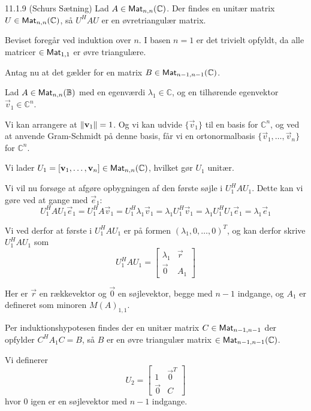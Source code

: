 \begin{saetning}{11.1.9 (Schurs Sætning)}
	Lad $A\in \textsf{Mat}_{n,n}(\mathbb{C})$. Der findes en unitær matrix $U\in \textsf{Mat}_{
	n,n}(\mathbb{C})$, så $U^HAU$ er en øvretriangulær matrix.
\end{saetning}

\begin{bevis}
	\setlength{\parindent}{0cm}
	Beviset foregår ved induktion over $n$. I basen $n=1$ er det trivielt
	opfyldt, da alle matricer $\in \textsf{Mat}_{1,1}$ er øvre triangulære.
	
	\noindent
	Antag nu at det gælder for en matrix $B \in \textsf{Mat}_{n-1,n-1}(\mathbb{C})$.
	
	Lad $A\in \textsf{Mat}_{n,n}(\mathbb{B})$ med en egenværdi $\lambda_1 \in
	\mathbb{C}$, og en tilhørende egenvektor $\vec{v}_1 \in \mathbb{C}^n$.

	Vi kan arrangere at $\lVert\mathbf{v}_1\rVert = 1$. Og vi kan udvide
	$\{\vec{v}_1\}$ til en basis for $\mathbb{C}^n$, og ved at anvende
	Gram-Schmidt på denne basis, får vi en ortonormalbasis $\{\vec{v}_1, \dotsc
	,\vec{v}_n\}$ for $\mathbb{C}^n$.

	Vi lader $U_1 = [\mathbf{v}_1, \dotsc, \mathbf{v}_n] \in \textsf{Mat}_{n,n}(\mathbb{C})$,
	hvilket gør $U_1$ unitær.

	Vi vil nu forsøge at afgøre opbygningen af den første søjle i $U_1^HAU_1$.
	Dette kan vi gøre ved at gange med $\vec{e}_1$:
	\[
		U_1^HAU_1\vec{e}_1
		= U_1^HA\vec{v}_1
		= U_1^H\lambda_1\vec{v}_1
		= \lambda_1U_1^H\vec{v}_1
		= \lambda_1U_1^HU_1\vec{e}_1
		= \lambda_1\vec{e}_1
	\]

	Vi ved derfor at første i $U_1^HAU_1$ er på formen $(\lambda_1, 0,
	\dotsc,0)^T$, og kan derfor skrive $U_1^HAU_1$ som
	\[
		U_1^HAU_1 = \begin{bmatrix}
			\lambda_1 & \vec{r}\\
			\vec{0}   & A_1
		\end{bmatrix}
	\]

	Her er $\vec{r}$ en rækkevektor og $\vec{0}$ en søjlevektor, begge med
	$n-1$ indgange, og $A_1$ er defineret som minoren $M(A)_{1,1}$.
	
	Per induktionshypotesen findes der en unitær matrix $C \in \textsf{Mat}_{n-1,n-1}$
	der opfylder $C^HA_1C=B$, så $B$ er en øvre triangulær matrix $\in
	\textsf{Mat}_{n-1,n-1}(\mathbb{C})$.

	Vi definerer
	\[
		U_2 = \begin{bmatrix}
			1       & \vec{0}^T\\
			\vec{0} & C
		\end{bmatrix}
	\]
	hvor $0$ igen er en søjlevektor med $n-1$ indgange.


\end{bevis}

